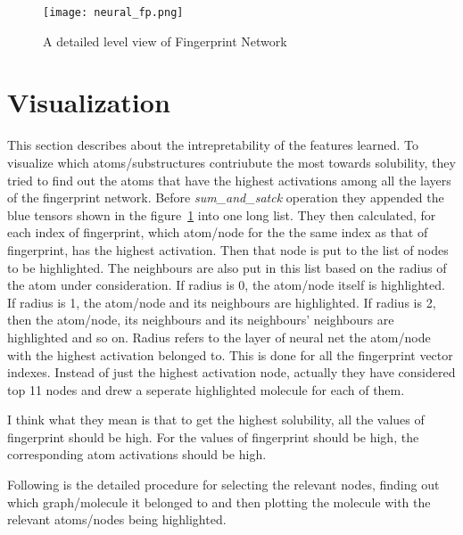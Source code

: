 \documentclass[10pt,a4paper,Times new roman]{report}
\begin{document}
\begin{figure}[]
	\centering
	\caption{A detailed level view of Fingerprint Network}
	\label{neural_fp}
	\texttt{[image: neural\_fp.png]}
\end{figure}


\section{Visualization}
This section describes about the intrepretability of the features learned. To visualize which atoms/substructures contriubute the most towards solubility, they tried to find out the atoms that have the highest activations among all the layers of the fingerprint network. Before \textit{sum\_and\_satck} operation they appended the blue tensors shown in the figure~\ref{neural_fp} into one long list. They then calculated, for each index of fingerprint, which atom/node for the the same index as that of fingerprint, has the highest activation. Then that node is put to the list of nodes to be highlighted. The neighbours are also put in this list based on the radius of the atom under consideration. If radius is 0, the atom/node itself is highlighted. If radius is 1, the atom/node and its neighbours are highlighted. If radius is 2, then the atom/node, its neighbours and its neighbours' neighbours are highlighted and so on. Radius refers to the layer of neural net the atom/node with the highest activation belonged to. This is done for all the fingerprint vector indexes. Instead of just the highest activation node, actually they have considered top 11 nodes and drew a seperate highlighted molecule for each of them.


I think what they mean is that to get the highest solubility, all the values of fingerprint should be high. For the values of fingerprint should be high, the corresponding atom activations should be high.

Following is the detailed procedure for selecting the relevant nodes, finding out which graph/molecule it belonged to and then plotting the molecule with the relevant atoms/nodes being highlighted.\\
\end{document}
